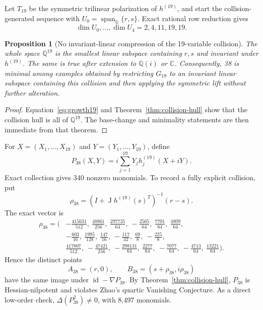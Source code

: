 \documentclass[11pt]{article}
\newtheorem{proposition}[theorem]{Proposition}
\theoremstyle{remark}
\DeclareMathOperator{\J}{J}
\newcommand{\Q}{\mathbb{Q}}
\newcommand{\C}{\mathbb{C}}
\newcommand{\id}{\operatorname{id}}
\begin{document}
Let $T_{19}$ be the symmetric trilinear polarization of $h^{(19)}$, and start the collision-generated sequence with $U_0=\operatorname{span}_{\Q}\{r,s\}$. Exact rational row reduction gives
\begin{equation}\label{eq:growth19}
\dim U_0,\ldots,\dim U_4=2,4,11,19,19.
\end{equation}

\begin{proposition}[No invariant-linear compression of the 19-variable collision]\label{prop:no19compression}
The whole space $\Q^{19}$ is the smallest linear subspace containing $r,s$ and invariant under $h^{(19)}$. The same is true after extension to $\Q(i)$ or $\C$. Consequently, 38 is minimal among examples obtained by restricting $G_{19}$ to an invariant linear subspace containing this collision and then applying the symmetric lift without further alteration.
\end{proposition}

\begin{proof}
Equation~\eqref{eq:growth19} and Theorem~\ref{thm:collision-hull} show that the collision hull is all of $\Q^{19}$. The base-change and minimality statements are then immediate from that theorem.
\end{proof}

For $X=(X_1,\ldots,X_{19})$ and $Y=(Y_1,\ldots,Y_{19})$, define
\begin{equation}\label{eq:P38}
\boxed{P_{38}(X,Y)=i\sum_{j=1}^{19}Y_jh^{(19)}_j(X+iY).}
\end{equation}
Exact collection gives 340 nonzero monomials. To record a fully explicit collision, put
\[
\rho_{38}=(I+\J h^{(19)}(s)^T)^{-1}(r-s).
\]
The exact vector is
\[
\begin{split}
\rho_{38}=(&-\tfrac{415631}{512},\ \tfrac{48861}{256},\ \tfrac{297735}{64},\ -\tfrac{2565}{64},\ \tfrac{7701}{64},\ \tfrac{4809}{64},\\
&-\tfrac{603}{16},\ \tfrac{1995}{128},\ \tfrac{147}{16},\ -\tfrac{117}{32},\ \tfrac{69}{8},\ -\tfrac{225}{8},\\
&\tfrac{417807}{512},\ -\tfrac{47421}{256},\ -\tfrac{298131}{64},\ \tfrac{2277}{64},\ -\tfrac{7077}{64},\ -\tfrac{4713}{64},\ \tfrac{13221}{64}).
\end{split}
\]
Hence the distinct points
\begin{equation}\label{eq:collision38}
A_{38}=(r,0),\qquad B_{38}=(s+\rho_{38},i\rho_{38})
\end{equation}
have the same image under $\id-\nabla P_{38}$. By Theorem~\ref{thm:collision-hull}, $P_{38}$ is Hessian-nilpotent and violates Zhao's quartic Vanishing Conjecture. As a direct low-order check, $\Delta(P_{38}^2)\ne0$, with 8,497 monomials.
\end{document}
